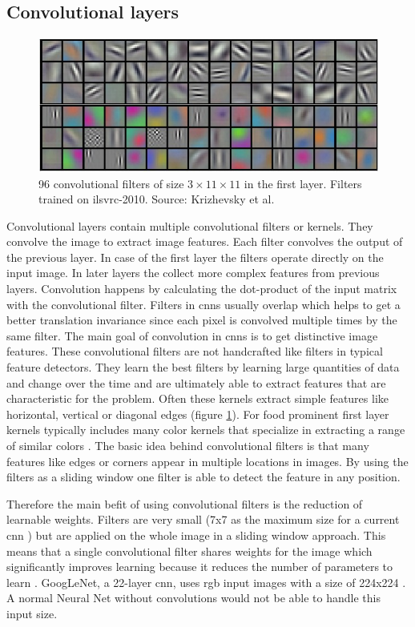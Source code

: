 \subsection*{Convolutional layers}
\begin{figure}[ht]
	\centering
	\includegraphics[scale=0.45]{figures/theoryCNN_filter}
	\caption{96 convolutional filters of size $3\times 11\times 11$ in the first layer. Filters trained on \gls{ilsvrc}-2010. Source: Krizhevsky et al. \cite{Krizhevsky2012}}
	\label{fig:cnnFilter}
\end{figure}
Convolutional layers contain multiple convolutional filters or kernels. They convolve the image to extract image features. Each filter convolves the output of the previous layer. In case of the first layer the filters operate directly on the input image. In later layers the collect more complex features from previous layers. Convolution happens by calculating the dot-product of the input matrix with the convolutional filter. Filters in \glspl{cnn} usually overlap which helps to get a better translation invariance since each pixel is convolved multiple times by the same filter. The main goal of convolution in \glspl{cnn} is to get distinctive image features. These convolutional filters are not handcrafted like filters in typical feature detectors. They learn the best filters by learning large quantities of data and change over the time and are ultimately able to extract features that are characteristic for the problem. Often these kernels extract simple features like horizontal, vertical or diagonal edges {(figure \ref{fig:cnnFilter})}. For food prominent first layer kernels typically includes many color kernels that specialize in extracting a range of similar colors \cite{Christodoulidis2015}. The basic idea behind convolutional filters is that many features like edges or corners appear in multiple locations in images. By using the filters as a sliding window one filter is able to detect the feature in any position.  

Therefore the main befit of using convolutional filters is the reduction of learnable weights. Filters are very small {(7x7 as the maximum size for a current \gls{cnn} \cite{Szegedy2014})} but are applied on the whole image in a sliding window approach. This means that a single convolutional filter shares weights for the image which significantly improves learning because it reduces the number of parameters to learn \cite{LeCun1998}. GoogLeNet, a 22-layer \gls{cnn}, uses \gls{rgb} input images with a size of 224x224 \cite{Szegedy2014}. A normal Neural Net without convolutions would not be able to handle this input size.

